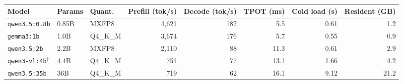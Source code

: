 \begin{tabular}{@{}lllrrrrr@{}}
\toprule
Model & Params & Quant. & Prefill (tok/s) & Decode (tok/s) & TPOT (ms) & Cold load (s) & Resident (GB) \\
\midrule
\texttt{qwen3.5:0.8b} & 0.85B & MXFP8 & 4,621 & 182 & 5.5 & 0.61 & 1.2 \\
\texttt{gemma3:1b} & 1.0B & Q4\_K\_M & 3,674 & 176 & 5.7 & 0.55 & 0.9 \\
\texttt{qwen3.5:2b} & 2.2B & MXFP8 & 2,110 & 88 & 11.3 & 0.61 & 2.9 \\
\texttt{qwen3-vl:4b}$^\dagger$ & 4.4B & Q4\_K\_M & 751 & 77 & 13.1 & 1.66 & 4.2 \\
\texttt{qwen3.5:35b} & 36B & Q4\_K\_M & 719 & 62 & 16.1 & 9.12 & 21.2 \\
\bottomrule
\end{tabular}

